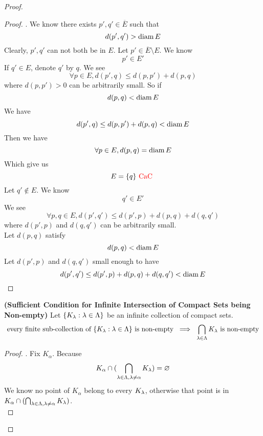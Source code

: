 \documentclass{report}
\begin{document}
\begin{proof}
\begin{proof}
. We know there exists $p',q'\in \overline{E}$ such that
\begin{equation}
d(p',q')>\text{diam}\, E
\end{equation}
Clearly, $p',q'$ can not both be in  $E$. Let $p'\in \overline{E}\setminus E$. We know 
\begin{equation}
p'\in E'
\end{equation}
If $q'\in E$, denote $q'$ by  $q$. We see
\begin{equation}
\forall p\in  E,d(p',q)\leq d(p,p')+d(p,q)
\end{equation}
where $d(p,p')>0$ can be arbitrarily small. So if 
\begin{equation}
d(p,q)<\text{diam}\, E
\end{equation}
We have
\begin{equation}
d(p',q)\leq d(p,p')+d(p,q)<\text{diam}\, E
\end{equation}
Then we have
\begin{equation}
\forall p\in E, d(p,q)=\text{diam}\, E
\end{equation}
Which give us 
\begin{equation}
E=\{ q \}\text{ \textcolor{red}{CaC} }
\end{equation}
Let $q'\not\in E$. We know
\begin{equation}
q'\in E'
\end{equation}
We see 
\begin{equation}
\forall p,q\in E, d(p',q')\leq d(p',p)+d(p,q)+d(q,q')
\end{equation}
where $d(p',p)$ and $d(q,q')$ can be arbitrarily small.\\

Let $d(p,q)$ satisfy 
\begin{equation}
d(p,q)<\text{diam}\, E
\end{equation}
Let $d(p',p)$ and $d(q,q')$ small enough to have 
\begin{equation}
d(p',q')\leq d(p',p)+d(p,q)+d(q,q')<\text{diam}\, E
\end{equation}
\end{proof}
\begin{theorem}
\label{1.13.5}
\textbf{(Sufficient Condition for Infinite Intersection of Compact Sets being Non-empty)} Let $\{ K_\lambda :\lambda \in \Lambda  \}$ be an infinite collection of compact sets.
\begin{equation}
\text{ every finite sub-collection of $\{ K_\lambda:\lambda \in\Lambda  \}$ is non-empty }\implies \text{ $\bigcap_{\lambda\in \Lambda }  K_\lambda $ is non-empty }
\end{equation}
\end{theorem}
\begin{proof}
. Fix $K_{\alpha }$. Because 
\begin{equation}
K_{\alpha }\cap (\bigcap_{\lambda \in \Lambda ,\lambda \neq \alpha }K_{\lambda  })=\varnothing
\end{equation}
We know no point of $K_{\alpha }$ belong to every $K_\lambda $, otherwise that point is in $K_{\alpha }\cap (\bigcap_{\lambda \in \Lambda ,\lambda \neq \alpha }K_\lambda )$.\\


\end{proof}
\end{proof}
\end{document}
